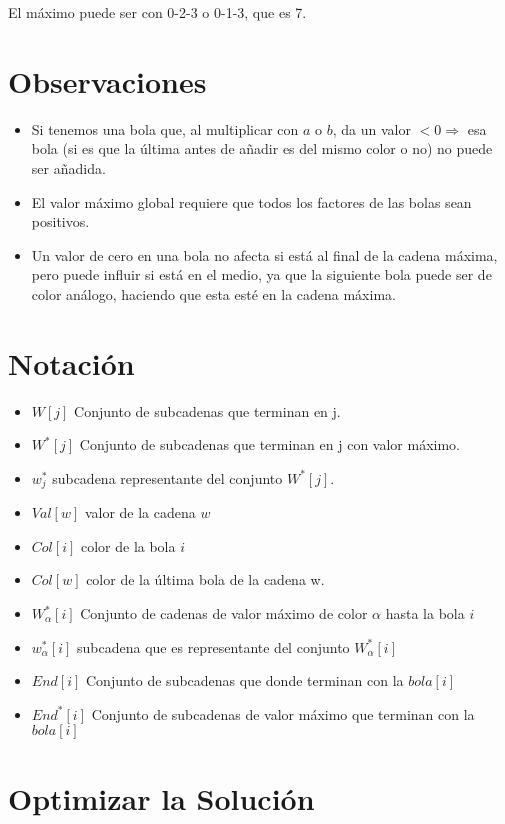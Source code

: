 \documentclass{article}
\begin{document}
El máximo puede ser con 0-2-3 o 0-1-3, que es 7.

\section{Observaciones}
\begin{itemize}
    \item Si tenemos una bola que, al multiplicar con $a$ o $b$, da un valor $< 0 \Rightarrow$ esa bola (si es que la última antes de añadir es del mismo color o no) no puede ser añadida.
    \item El valor máximo global requiere que todos los factores de las bolas sean positivos.
    \item Un valor de cero en una bola no afecta si está al final de la cadena máxima, pero puede influir si está en el medio, ya que la siguiente bola puede ser de color análogo, haciendo que esta esté en la cadena máxima.
\end{itemize}


\section{Notación}
\begin{itemize} 
  \item $W[j]$ Conjunto de subcadenas que terminan en j.
  \item $W^*[j]$ Conjunto de subcadenas que terminan en j con valor máximo.
  \item $w^*_j$ subcadena representante del conjunto $W^*[j]$.
  \item $Val[w]$ valor de la cadena $w$
  \item $Col[i]$ color de la bola $i$
  \item $Col[w]$ color de la última bola de la cadena w.
  \item $W^*_\alpha[i]$ Conjunto de cadenas de valor máximo de color $\alpha$ hasta la bola $i$
  \item $w^*_\alpha[i]$ subcadena que es representante del conjunto $W^*_\alpha[i]$ 
  \item $End[i]$ Conjunto de subcadenas que donde terminan con la $bola[i]$
  \item $End^*[i]$ Conjunto de  subcadenas de valor máximo que terminan con la  $bola[i]$
  
\end{itemize}

\section{Optimizar la Solución}
 
\end{document}
